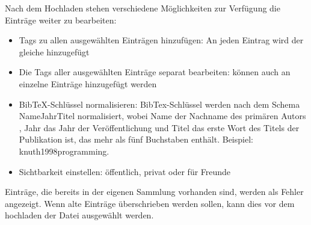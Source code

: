 Nach dem Hochladen stehen verschiedene Möglichkeiten zur Verfügung die Einträge weiter zu bearbeiten:
\begin{itemize}
\item Tags zu allen ausgewählten Einträgen hinzufügen: An jeden Eintrag wird der gleiche \tag hinzugefügt
\item Die Tags aller ausgewählten Einträge separat bearbeiten: \tags können auch an einzelne Einträge hinzugefügt werden
\item BibTeX-Schlüssel normalisieren: BibTex-Schlüssel werden nach dem Schema NameJahrTitel normalisiert, wobei Name der Nachname des primären Autors , Jahr das Jahr der Veröffentlichung und Titel das erste Wort des Titels der Publikation ist, das mehr als fünf Buchstaben enthält. Beispiel: knuth1998programming.
\item Sichtbarkeit einstellen: öffentlich, privat oder für Freunde 
\end{itemize}
\begin{tip} Einträge, die bereits in der eigenen Sammlung vorhanden sind, werden als Fehler angezeigt. Wenn alte Einträge überschrieben werden sollen, kann dies vor dem hochladen der Datei ausgewählt werden.
\end{tip}

